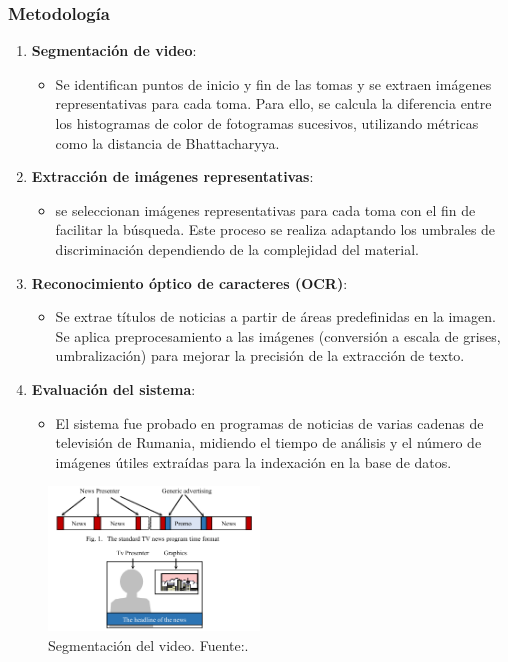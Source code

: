 \subsubsection {Metodología }
\begin{enumerate}
	\item \textbf{Segmentación de video}:
	\begin{itemize}
		\item Se identifican puntos de inicio y fin de las tomas y se extraen imágenes representativas para cada toma. Para ello, se calcula la diferencia entre los histogramas de color de fotogramas sucesivos, utilizando métricas como la distancia de Bhattacharyya.
	\end{itemize}
	
	\item \textbf{Extracción de imágenes representativas}:
	\begin{itemize}
		\item se seleccionan imágenes representativas para cada toma con el fin de facilitar la búsqueda. Este proceso se realiza adaptando los umbrales de discriminación dependiendo de la complejidad del material.
	\end{itemize}
	
	\item \textbf{Reconocimiento óptico de caracteres (OCR)}:
	\begin{itemize}
		\item Se extrae títulos de noticias a partir de áreas predefinidas en la imagen. Se aplica preprocesamiento a las imágenes (conversión a escala de grises, umbralización) para mejorar la precisión de la extracción de texto.
	\end{itemize}
	
	\item \textbf{Evaluación del sistema}:
	\begin{itemize}
		\item  El sistema fue probado en programas de noticias de varias cadenas de televisión de Rumania, midiendo el tiempo de análisis y el número de imágenes útiles extraídas para la indexación en la base de datos.
	\end{itemize}
\end{enumerate}
\begin{figure}[H]
	\centering
	\includegraphics[width=0.5\textwidth]{2/figures/Metodologia_ant_3.png}
	\caption{Segmentación del video. Fuente:\cite {rozsa2022tv}.}
	\label{fig:etiqueta_de_la_figura}
\end{figure}

